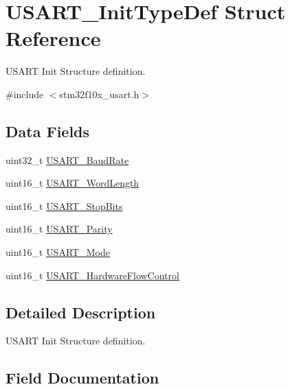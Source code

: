 \hypertarget{struct_u_s_a_r_t___init_type_def}{}\section{U\+S\+A\+R\+T\+\_\+\+Init\+Type\+Def Struct Reference}
\label{struct_u_s_a_r_t___init_type_def}


U\+S\+A\+RT Init Structure definition.  




{\ttfamily \#include $<$stm32f10x\+\_\+usart.\+h$>$}

\subsection*{Data Fields}
\begin{DoxyCompactItemize}
\item 
uint32\+\_\+t \mbox{\hyperlink{struct_u_s_a_r_t___init_type_def_a8712e31ee9d088d83c84d38d88c6af0b}{U\+S\+A\+R\+T\+\_\+\+Baud\+Rate}}
\item 
uint16\+\_\+t \mbox{\hyperlink{struct_u_s_a_r_t___init_type_def_aa1248b67914e095c0de768223eea9328}{U\+S\+A\+R\+T\+\_\+\+Word\+Length}}
\item 
uint16\+\_\+t \mbox{\hyperlink{struct_u_s_a_r_t___init_type_def_aa58409990a6a0bc99f432eb90e204c0f}{U\+S\+A\+R\+T\+\_\+\+Stop\+Bits}}
\item 
uint16\+\_\+t \mbox{\hyperlink{struct_u_s_a_r_t___init_type_def_a4edcc84644c8553a1a6e841c48ea8413}{U\+S\+A\+R\+T\+\_\+\+Parity}}
\item 
uint16\+\_\+t \mbox{\hyperlink{struct_u_s_a_r_t___init_type_def_a1a581f24451bf5a4a210bab8d68998e2}{U\+S\+A\+R\+T\+\_\+\+Mode}}
\item 
uint16\+\_\+t \mbox{\hyperlink{struct_u_s_a_r_t___init_type_def_ab41fe3b9f5cb4ed89be23bff0a1f4114}{U\+S\+A\+R\+T\+\_\+\+Hardware\+Flow\+Control}}
\end{DoxyCompactItemize}


\subsection{Detailed Description}
U\+S\+A\+RT Init Structure definition. 



\subsection{Field Documentation}
\mbox{\label{struct_u_s_a_r_t___init_type_def_a8712e31ee9d088d83c84d38d88c6af0b}} 
